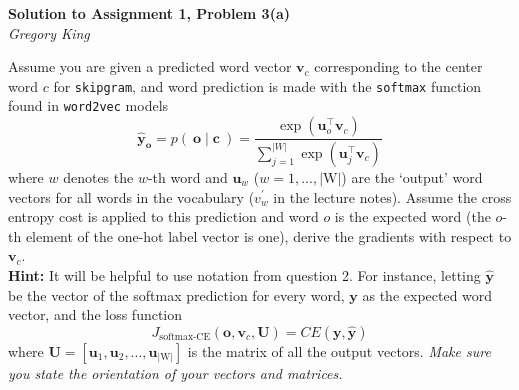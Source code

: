 \documentclass[letter,12pt]{article}
\newcommand{\myhwtitle}[3]
{\begin{center}
{\large {\bf Solution to Assignment {#1}, Problem {#2}}}\\
\medskip
{\it {#3}} %
\end{center}}
\newcommand{\solutionsAuthor}{Gregory King}
\begin{document}
\myhwtitle{1}{3(a)}{\solutionsAuthor}
\bigskip
\noindent Assume you are given a predicted word vector ${\boldsymbol v}_{c}$ corresponding to the center word $c$ for
\texttt{skipgram}, and word prediction is made with the \texttt{softmax} function found in \texttt{word2vec} models
\begin{equation}
{\hat{\boldsymbol y}}_{\boldsymbol o} = p(~{\boldsymbol o} \mid {\boldsymbol c}~) = \frac{\exp{({\boldsymbol u}^{\top}_{o}{\boldsymbol v}_{c})}}{\sum^{\vert{W}\vert}_{j=1}\exp{({\boldsymbol u}^{\top}_{j}{\boldsymbol v}_{c})}}
\end{equation}
where $w$ denotes the $w$-th word and ${\boldsymbol u}_{w}$ ($w=1,...,\vert\textrm{W}\vert$)  are the `output' word vectors for all words in the vocabulary ($v^{\prime}_{w}$ in the lecture notes). Assume the cross entropy cost is applied to this prediction and word $o$ is the expected word (the $o$-th element of the one-hot label vector is one), derive the gradients with respect to ${\boldsymbol v}_{c}$.\\

\noindent \textbf{Hint:} It will be helpful to use notation from question 2. For instance, letting ${\hat{\boldsymbol y}}$ be the vector of the softmax
prediction for every word, ${\boldsymbol y}$ as the expected word vector, and the loss function
\begin{equation}
J_{\textrm{softmax-CE}}({\boldsymbol o}, {\boldsymbol v}_{c}, {\boldsymbol U}) = CE({\boldsymbol y},{\hat{\boldsymbol y}})
\end{equation}
where ${\boldsymbol U} = [ {\boldsymbol u}_{1}, {\boldsymbol u}_{2},...,{\boldsymbol u}_{\vert\textrm{W}\vert}]$ is the matrix of all the output vectors. \textit{Make sure you state the orientation of your vectors and matrices.}\vspace{5mm}
\end{document}
